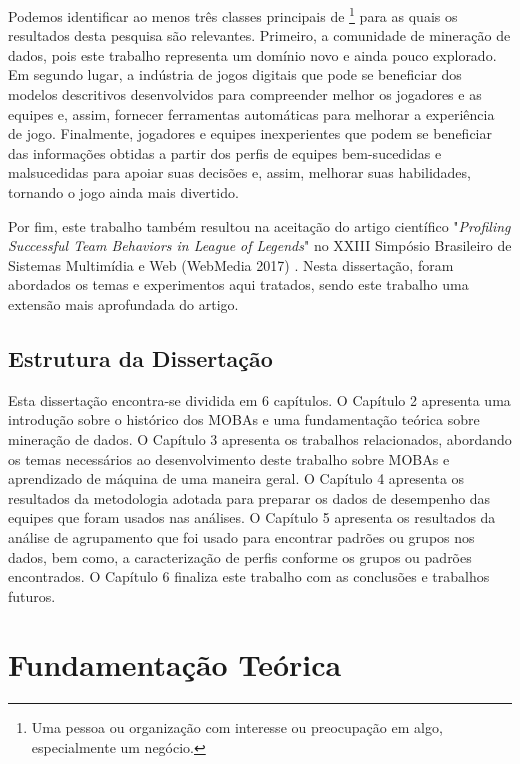 Podemos identificar ao menos três classes principais de \textit{} \footnote{Uma pessoa ou organização com interesse ou preocupação em algo, especialmente um negócio.} para as quais os resultados desta pesquisa são relevantes. Primeiro, a comunidade de mineração de dados, pois este trabalho representa um domínio novo e ainda pouco explorado. Em segundo lugar, a indústria de jogos digitais que pode se beneficiar dos modelos descritivos  desenvolvidos para compreender melhor os jogadores e as equipes e, assim, fornecer ferramentas automáticas para melhorar a experiência de jogo. Finalmente, jogadores e equipes inexperientes que podem se beneficiar das informações obtidas a partir dos perfis de equipes bem-sucedidas e malsucedidas para apoiar suas decisões e, assim, melhorar suas habilidades, tornando o jogo ainda mais divertido.

Por fim, este trabalho também resultou na aceitação do artigo científico "\textit{Profiling Successful Team Behaviors in League of Legends}" no XXIII Simpósio Brasileiro de Sistemas Multimídia e Web (WebMedia 2017) . Nesta disserta\c{c}\~{a}o, foram abordados os temas e experimentos aqui tratados, sendo este trabalho uma extensão mais aprofundada do artigo.

\section{Estrutura da Dissertação}
Esta dissertação encontra-se dividida em 6 capítulos. O Capítulo 2 apresenta uma introdução sobre o histórico dos MOBAs e uma fundamentação teórica sobre mineração de dados. O Capítulo 3 apresenta os trabalhos relacionados, abordando os temas necessários ao desenvolvimento deste trabalho sobre MOBAs e aprendizado de máquina de uma maneira geral. O Capítulo 4 apresenta os resultados da metodologia adotada para preparar os dados de desempenho das equipes que foram usados nas análises. O Capítulo 5 apresenta os resultados da análise de agrupamento que foi usado para encontrar padrões ou grupos nos dados, bem como, a caracterização de perfis conforme os grupos ou padrões encontrados. O Capítulo 6 finaliza este trabalho com as conclusões e trabalhos futuros.

\chapter{Fundamentação Teórica}

